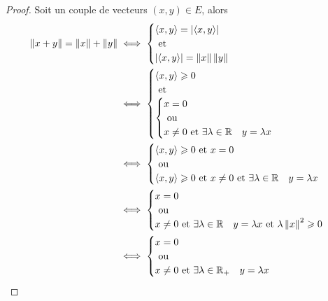  \begin{proof}
    Soit un couple de  vecteurs \((x,y) \in E\), alors
    \begin{align}
      \left\lVert x+y\right\rVert = \left\lVert x\right\rVert+\left\lVert y\right\rVert &\iff \begin{cases} \left\langle{x},{y}\right\rangle = \left\lvert\left\langle{x},{y}\right\rangle\right\rvert \\ \text{~et~} \\ \left\lvert\left\langle{x},{y}\right\rangle\right\rvert = \left\lVert x\right\rVert\left\lVert y\right\rVert\end{cases} \\
                                        &\iff  \begin{cases}  \left\langle{x},{y}\right\rangle \geqslant 0 \\ \text{~et~} \\ \begin{cases} x=0 \\ \text{~ou~} \\ x\neq 0 \text{~et~} \exists \lambda \in \mathbb{R} \quad y=\lambda x\end{cases} \end{cases}\\
                                        & \iff \begin{cases} \left\langle{x},{y}\right\rangle \geqslant 0 \text{~et~} x =0 \\ \text{~ou~} \\  \left\langle{x},{y}\right\rangle \geqslant 0 \text{~et~} x \neq 0 \text{~et~} \exists \lambda \in \mathbb{R} \quad y=\lambda x \end{cases}\\
                                        & \iff \begin{cases} x=0 \\ \text{~ou~} \\ x \neq 0 \text{~et~} \exists \lambda \in \mathbb{R} \quad y=\lambda x \text{~et~} \lambda\left\lVert x\right\rVert^2 \geqslant 0 \end{cases} \\
                                        & \iff \begin{cases} x=0 \\ \text{~ou~} \\ x \neq 0 \text{~et~} \exists \lambda \in \mathbb{R}_{+} \quad y=\lambda x \end{cases}
    \end{align}
  \end{proof}

